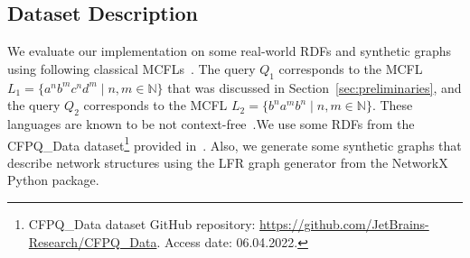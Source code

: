 

\subsection{Dataset Description}
We evaluate our implementation on some real-world RDFs and synthetic graphs using following classical MCFLs~\cite{gotzmannmultiple}. The query $Q_1$ corresponds to the MCFL $L_1 = \{a^nb^mc^nd^m \mid n,m \in \mathbb{N}\}$ that was discussed in Section~\ref{sec:preliminaries}, and the query $Q_2$ corresponds to the MCFL $L_2 = \{b^na^mb^n \mid n,m \in \mathbb{N}\}$. These languages are known to be not context-free~\cite{seki1991multiple}.We use some RDFs from the CFPQ\_Data
dataset\footnote{CFPQ\_Data dataset GitHub repository: \url{https://github.com/JetBrains-Research/CFPQ\_Data}. Access date: 06.04.2022.} provided in~\cite{10.1145/3398682.3399163}. Also, we generate some synthetic graphs that describe network structures using the LFR graph generator from the NetworkX~\cite{hagberg2008exploring} Python package.





